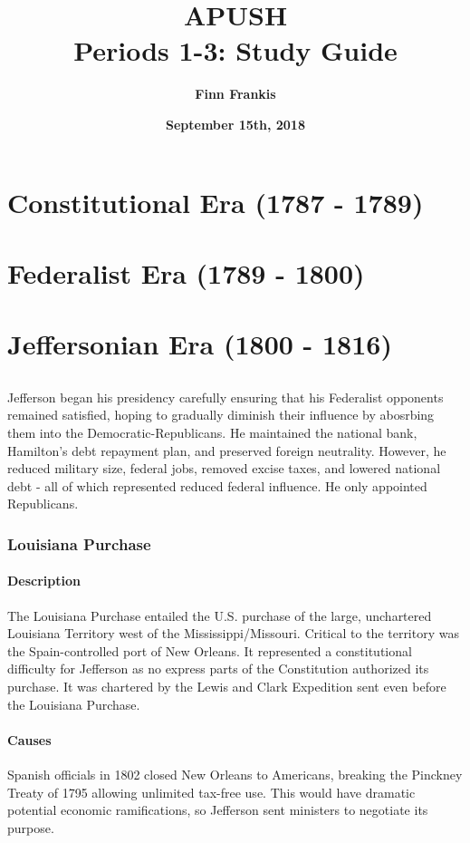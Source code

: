 \documentclass{article}
\title{%
      \LARGE \textbf{APUSH} \\ \Large \textbf{Periods 1-3: Study Guide}}
\author{\textbf{Finn Frankis}}
\date{\textbf{September 15th, 2018}}
\begin{document}
    \maketitle
    \setcounter{tocdepth}{2}
    \tableofcontents
    \section{Constitutional Era (1787 - 1789)}
    \section{Federalist Era (1789 - 1800)}
    \section {Jeffersonian Era (1800 - 1816)}
    \subsection{\color{red}{Cultural}}
    \subsection{\color{blue}{Political}}
    Jefferson began his presidency carefully ensuring that his Federalist opponents remained satisfied, hoping to gradually diminish their influence by abosrbing them into the Democratic-Republicans. He maintained the national bank, Hamilton's debt repayment plan, and preserved foreign neutrality. However, he reduced military size, federal jobs, removed excise taxes, and lowered national debt - all of which represented reduced federal influence. He only appointed Republicans.
    \subsubsection{Louisiana Purchase}
    \paragraph{Description}
    The Louisiana Purchase entailed the U.S. purchase of the large, unchartered Louisiana Territory west of the Mississippi/Missouri. Critical to the territory was the Spain-controlled port of New Orleans. It represented a constitutional difficulty for Jefferson as no express parts of the Constitution authorized its purchase. It was chartered by the Lewis and Clark Expedition sent even before the Louisiana Purchase.
    \paragraph{Causes}
    Spanish officials in 1802 closed New Orleans to Americans, breaking the Pinckney Treaty of 1795 allowing unlimited tax-free use. This would have dramatic potential economic ramifications, so Jefferson sent ministers to negotiate its purpose.
\end{document}
